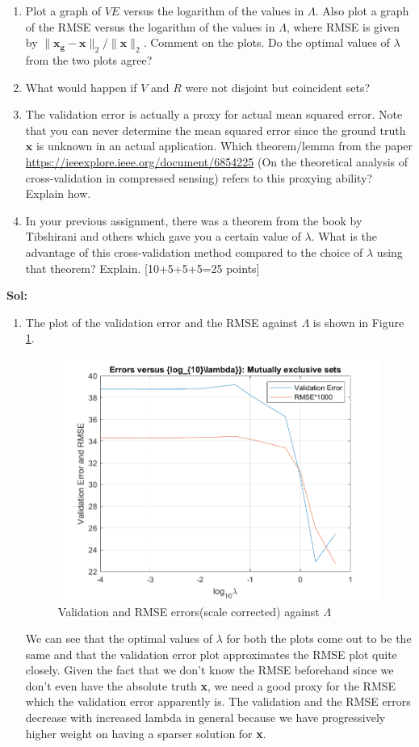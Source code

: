 \documentclass[11pt]{article}
\begin{document}
\begin{enumerate}
\begin{enumerate}
\item Plot a graph of $VE$ versus the logarithm of the values in $\Lambda$.  Also plot a graph of the RMSE versus the logarithm of the values in $\Lambda$, where RMSE is given by $\|\boldsymbol{x_g} - \boldsymbol{x}\|_2 / \|\boldsymbol{x}\|_2$. Comment on the plots. Do the optimal values of $\lambda$ from the two plots agree?
\item What would happen if $V$ and $R$ were not disjoint but coincident sets? 
\item The validation error is actually a proxy for actual mean squared error. Note that you can never determine the mean squared error since the ground truth $\boldsymbol{x}$ is unknown in an actual application. Which theorem/lemma from the paper \url{https://ieeexplore.ieee.org/document/6854225} (On the theoretical analysis of cross-validation in compressed sensing) refers to this proxying ability? Explain how.  
\item In your previous assignment, there was a theorem from the book by Tibshirani and others which gave you a certain value of $\lambda$. What is the advantage of this cross-validation method compared to the choice of $\lambda$ using that theorem? Explain.
\textsf{[10+5+5+5=25 points]}
\end{enumerate}

\textbf{Sol:}\\
\begin{enumerate}
    \item The plot of the validation error and the RMSE against $\Lambda$ is shown in Figure \ref{fig:1}.
    \begin{figure}[h!]
        \centering
        \includegraphics[width=0.7\linewidth]{images/plot1.png}
        \caption{Validation and RMSE errors(scale corrected) against $\Lambda$}
        \label{fig:1}
    \end{figure}
    We can see that the optimal values of $\lambda$ for both the plots come out to be the same and that the validation error plot approximates the RMSE plot quite closely. Given the fact that we don't know the RMSE beforehand since we don't even have the absolute truth \textbf{x}, we need a good proxy for the RMSE which the validation error apparently is. The validation and the RMSE errors decrease with increased lambda in general because we have progressively higher weight on having a sparser solution for \textbf{x}. 


\end{enumerate}
\end{enumerate}
\end{document}
